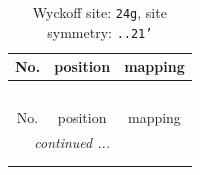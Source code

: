 \documentclass[fleqn,8pt]{jsarticle}
\begin{document}
\renewcommand{\arraystretch}{1.2}
\begin{longtable}{ccc}
\caption{Wyckoff site: {\tt 24g}, site symmetry: {\tt ..21'}}
 \\
 \hline \hline
No. & position & mapping \\ \hline \endfirsthead

\multicolumn{2}{l}{\tablename\ \thetable{}} \\
 \hline \hline
No. & position & mapping \\ \hline \endhead

 \hline \hline
\multicolumn{2}{r}{\footnotesize\it continued ...} \\ \endfoot

 \hline \hline
\multicolumn{2}{r}{} \\ \endlastfoot


\end{longtable}
\end{document}
